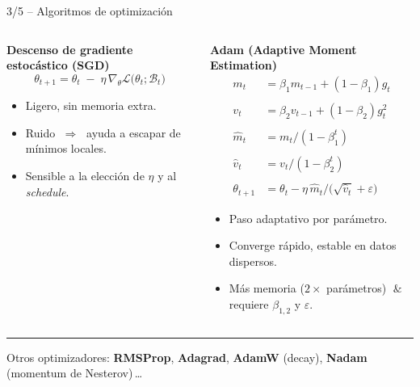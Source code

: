 \documentclass[8pt,spanish]{beamer}
\begin{document}
\begin{frame}[fragile]{3/5  --  Algoritmos de optimización}
  \begin{columns}[T]
    \begin{column}{0.52\textwidth}
      \textbf{Descenso de gradiente estocástico (SGD)}
      \[
        \theta_{t+1}
          = \theta_t \;-\;
            \eta\,\nabla_\theta
            \mathcal{L}\bigl(\theta_t; \mathcal{B}_t\bigr)
      \]
      \begin{itemize}
        \item Ligero, sin memoria extra.
        \item Ruido $\;\Rightarrow\;$ ayuda a escapar de mínimos locales.
        \item Sensible a la elección de \(\eta\) y al \emph{schedule}.
      \end{itemize}
    \end{column}

    \begin{column}{0.48\textwidth}
      \textbf{Adam (Adaptive Moment Estimation)}
      \[
        \begin{aligned}
          m_t &= \beta_1 m_{t-1} + (1-\beta_1) g_t \\\\
          v_t &= \beta_2 v_{t-1} + (1-\beta_2) g_t^{2} \\\\
          \hat m_t &= m_t /(1-\beta_1^{t}) \\\\
          \hat v_t &= v_t /(1-\beta_2^{t}) \\\\
          \theta_{t+1} &= \theta_t - \eta\,\hat m_t/\bigl(\sqrt{\hat v_t}+\varepsilon\bigr)
        \end{aligned}
      \]
      \begin{itemize}
        \item Paso adaptativo por parámetro.
        \item Converge rápido, estable en datos dispersos.
        \item Más memoria (\(2\times\) parámetros) $\;\&\;$ requiere
              \(\beta_{1,2}\) y \(\varepsilon\).
      \end{itemize}
    \end{column}
  \end{columns}

  \vspace{0.35em}
  \hrule
  \vspace{0.35em}

  \centering
  \small
  Otros optimizadores: \textbf{RMSProp}, \textbf{Adagrad},
  \textbf{AdamW} (decay), \textbf{Nadam} (momentum de Nesterov)\,…
\end{frame}
\end{document}

